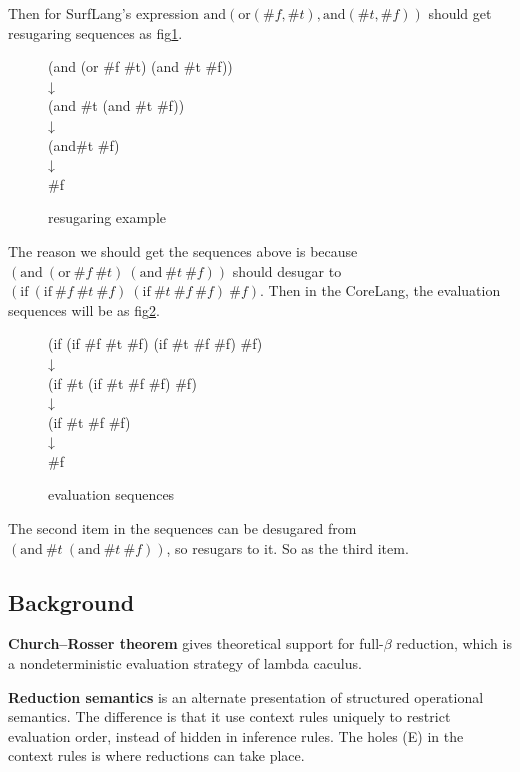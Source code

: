 Then for SurfLang's expression $\mbox{and}(\mbox{or}(\#f, \#t), \mbox{and}(\#t, \#f))$ should get resugaring sequences as fig\ref{fig:example}.

\begin{figure}[ht]
\parbox[t]{\textwidth}{
			\begin{center}  
				(and (or \#f \#t) (and \#t \#f))\\
				↓\\
				(and \#t (and \#t \#f))\\
				↓\\
				(and\#t \#f)\\
				↓\\
				\#f
			\end{center}  
		}
\caption{resugaring example}
\label{fig:example}
\end{figure}

The reason we should get the sequences above is because $(\mbox{and}~(\mbox{or}~\#f~\#t)~(\mbox{and}~\#t~\#f))$ should desugar to $(\mbox{if}~(\mbox{if}~\#f~\#t~\#f)~(\mbox{if}~\#t~\#f~\#f)~\#f)$. Then in the CoreLang, the evaluation sequences will be as fig\ref{fig:coreseq}.

\begin{figure}[ht]
\parbox[t]{\textwidth}{
			\begin{center}  
				(if (if \#f \#t \#f) (if \#t \#f \#f) \#f)\\
				↓\\
				(if \#t (if \#t \#f \#f) \#f)\\
				↓\\
				(if \#t \#f \#f)\\
				↓\\
				\#f
			\end{center}  
		}
\caption{evaluation sequences}
\label{fig:coreseq}
\end{figure}

The second item in the sequences can be desugared from $(\mbox{and}~\#t~(\mbox{and}~\#t~\#f))$, so resugars to it. So as the third item.

\subsection{Background}
{\bfseries Church–Rosser theorem}\cite{churchrosser} gives theoretical support for full-$\beta$ reduction, which is a nondeterministic evaluation strategy of lambda caculus. 

{\bfseries Reduction semantics}\cite{reduction} is an alternate presentation of structured operational semantics\cite{PLOTKIN}. The difference is that it use context rules uniquely to restrict evaluation order, instead of hidden in inference rules. The holes (E) in the context rules is where reductions can take place.

